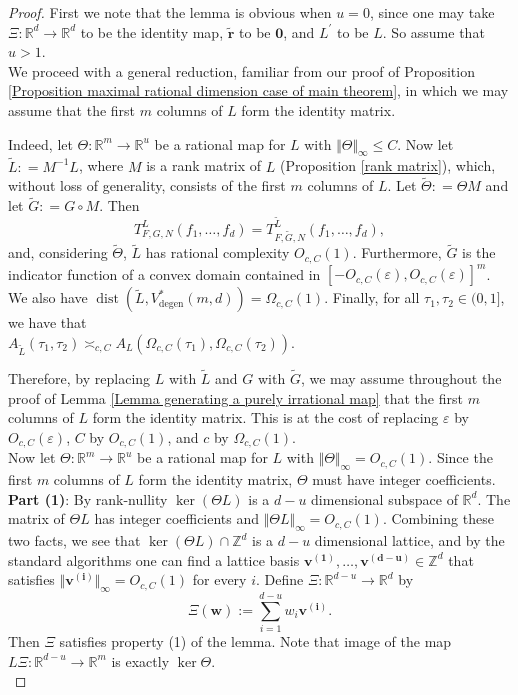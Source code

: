 \documentclass[12pt,a4paper,twoside,reqno]{amsart}
\newcommand{\degen}{\operatorname{degen}}
\newcommand{\dist}{\operatorname{dist}}
\numberwithin{equation}{section}
\begin{document}
\begin{proof}
First we note that the lemma is obvious when $u=0$, since one may take $\Xi:\mathbb{R}^d \longrightarrow \mathbb{R}^d$ to be the identity map, $\widetilde{\mathbf{r}}$ to be $\mathbf{0}$, and $L^\prime$ to be $L$. So assume that $u > 1$.\\

We proceed with a general reduction, familiar from our proof of Proposition \ref{Proposition maximal rational dimension case of main theorem}, in which we may assume that the first $m$ columns of $L$ form the identity matrix.

Indeed, let $\Theta:\mathbb{R}^m\longrightarrow \mathbb{R}^u$ be a rational map for $L$ with $\Vert \Theta \Vert_\infty \leqslant C$. Now let $\widetilde{L} : = M^{-1} L$, where $M$ is a rank matrix of $L$ (Proposition \ref{rank matrix}), which, without loss of generality, consists of the first $m$ columns of $L$. Let $\widetilde{\Theta} : = \Theta M$ and let $\widetilde{G}: = G\circ M$. Then \[ T_{F,G,N}^L(f_1,\dots,f_d) = T_{F,\widetilde{G},N} ^{\widetilde{L}}(f_1,\dots,f_d),\] and, considering $\widetilde{\Theta}$, $\widetilde{L}$ has rational complexity $O_{c,C}(1)$. Furthermore, $\widetilde{G}$ is the indicator function of a convex domain contained in $[-O_{c,C}(\varepsilon), O_{c,C}(\varepsilon)]^m$. We also have $\dist(\widetilde{L},V_{\degen}^*(m,d)) = \Omega_{c,C}(1)$. Finally, for all $\tau_1,\tau_2 \in (0,1]$, we have that\\ $A_{\widetilde{L}}(\tau_1,\tau_2) \asymp_{c,C} A_L(\Omega_{c,C}(\tau_1),\Omega_{c,C}(\tau_2))$. 

Therefore, by replacing $L$ with $\widetilde{L}$ and $G$ with $\widetilde{G}$, we may assume throughout the proof of Lemma \ref{Lemma generating a purely irrational map} that the first $m$ columns of $L$ form the identity matrix. This is at the cost of replacing $\varepsilon$ by $O_{c,C}(\varepsilon)$, $C$ by $O_{c,C}(1)$, and $c$ by $\Omega_{c,C}(1)$.  \\

Now let $\Theta:\mathbb{R}^m\longrightarrow \mathbb{R}^u$ be a rational map for $L$ with $\Vert \Theta \Vert_\infty = O_{c,C}(1)$. Since the first $m$ columns of $L$ form the identity matrix, $\Theta$ must have integer coefficients. \\

\textbf{Part (1)}: By rank-nullity $\ker (\Theta L)$ is a $d-u$ dimensional subspace of $\mathbb{R}^d$. The matrix of $\Theta L$ has integer coefficients and $\Vert \Theta L \Vert_\infty = O_{c,C}(1)$. Combining these two facts, we see that $\ker (\Theta L) \cap \mathbb{Z}^d$ is a $d-u$ dimensional lattice, and by the standard algorithms one can find a lattice basis $\mathbf{v^{(1)}},\dots, \mathbf{v^{(d-u)}} \in \mathbb{Z}^d$ that satisfies $\Vert \mathbf{v^{(i)}}\Vert_\infty = O_{c,C}(1)$ for every $i$. Define $\Xi:\mathbb{R}^{d-u} \longrightarrow \mathbb{R}^{d}$ by \[ \Xi(\mathbf{w}):= \sum\limits_{i=1}^{d-u} w_i \mathbf{v^{(i)}}.\] Then $\Xi$ satisfies property (1) of the lemma. Note that image of the map $L\Xi:\mathbb{R}^{d-u} \longrightarrow \mathbb{R}^m$ is exactly $\ker \Theta$. \\



\end{proof}
\end{document}
